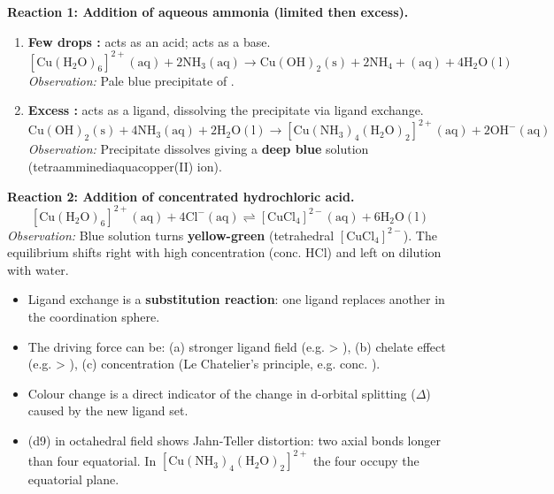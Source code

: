 \documentclass[11pt]{article}
\begin{document}
\begin{experience}
\textbf{Reaction 1: Addition of aqueous ammonia (limited then excess).}
\begin{enumerate}
\item \textbf{Few drops :}  acts as an acid;  acts as a base.
\[
\ensuremath{\mathrm{[Cu(H_{2}O)_{6}]^{2+}(aq) + 2NH_{3}(aq) \rightarrow  Cu(OH)_{2}(s) + 2NH_{4}+(aq) + 4H_{2}O(l)}}
\]
\textit{Observation:} Pale blue precipitate of .
\item \textbf{Excess :}  acts as a ligand, dissolving the precipitate via ligand exchange.
\[
\ensuremath{\mathrm{Cu(OH)_{2}(s) + 4NH_{3}(aq) + 2H_{2}O(l) \rightarrow  [Cu(NH_{3})_{4}(H_{2}O)_{2}]^{2+}(aq) + 2OH^{-}(aq)}}
\]
\textit{Observation:} Precipitate dissolves giving a \textbf{deep blue} solution (tetraamminediaquacopper(II) ion).
\end{enumerate}

\textbf{Reaction 2: Addition of concentrated hydrochloric acid.}
\[
\ensuremath{\mathrm{[Cu(H_{2}O)_{6}]^{2+}(aq) + 4Cl^{-}(aq) \rightleftharpoons  [CuCl_{4}]^{2-}(aq) + 6H_{2}O(l)}}
\]
\textit{Observation:} Blue solution turns \textbf{yellow-green} (tetrahedral \ensuremath{\mathrm{[CuCl_{4}]^{2-}}}). The equilibrium shifts right with high  concentration (conc. HCl) and left on dilution with water.
\end{experience}

\begin{aretenir}
\begin{itemize}
\item Ligand exchange is a \textbf{substitution reaction}: one ligand replaces another in the coordination sphere.
\item The driving force can be: (a) stronger ligand field (e.g.  > ), (b) chelate effect (e.g.  > ), (c) concentration (Le Chatelier's principle, e.g. conc. ).
\item Colour change is a direct indicator of the change in d-orbital splitting ($\Delta$) caused by the new ligand set.
\item {} (d9) in octahedral field shows Jahn-Teller distortion: two axial bonds longer than four equatorial. In \ensuremath{\mathrm{[Cu(NH_{3})_{4}(H_{2}O)_{2}]^{2+}}} the four  occupy the equatorial plane.
\end{itemize}
\end{aretenir}
\end{document}
